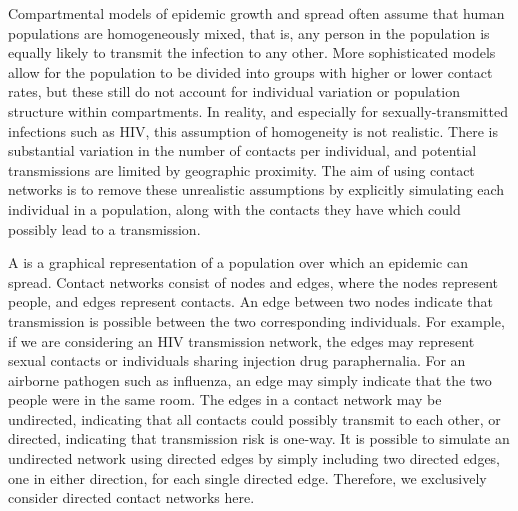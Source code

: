 Compartmental models of epidemic growth and spread often assume that human
populations are homogeneously mixed, that is, any person in the population is
equally likely to transmit the infection to any other. More sophisticated
models allow for the population to be divided into groups with higher or lower
contact rates, but these still do not account for individual variation or
population structure within compartments. In reality, and especially for
sexually-transmitted infections such as HIV, this assumption of homogeneity is
not realistic. There is substantial variation in the number of contacts per
individual, and potential transmissions are limited by geographic proximity.
The aim of using contact networks is to remove these unrealistic assumptions by 
explicitly simulating each individual in a population, along with the contacts
they have which could possibly lead to a transmission.

A  is a graphical representation of a population over
which an epidemic can spread. Contact networks consist of nodes and edges,
where the nodes represent people, and edges represent contacts. An edge between
two nodes indicate that transmission is possible between the two corresponding
individuals. For example, if we are considering an HIV transmission network,
the edges may represent sexual contacts or individuals sharing injection drug
paraphernalia. For an airborne pathogen such as influenza, an edge may simply
indicate that the two people were in the same room. The edges in a contact
network may be undirected, indicating that all contacts could possibly transmit
to each other, or directed, indicating that transmission risk is one-way. It is
possible to simulate an undirected network using directed edges by simply
including two directed edges, one in either direction, for each single directed
edge. Therefore, we exclusively consider directed contact networks here.

